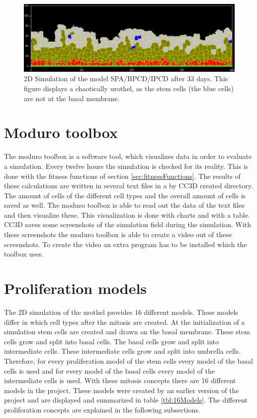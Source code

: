 \begin{figure}[ht]
	\center
	\includegraphics[scale=0.35]{figures/2DSimulation-33Days.png}
	\caption[2D Simulation of the model SPA/BPCD/IPCD after 33 days]{2D Simulation of the model SPA/BPCD/IPCD after 33 days. This figure displays a chaotically urothel, as the stem cells (the blue cells) are not at the basal membrane.}
	\label{img:2DSimulation33Days}
\end{figure}

\section{Moduro toolbox}
The moduro toolbox is a software tool, which visualizes data in order to evaluate a simulation. \newline
Every twelve hours the simulation is checked for its reality. This is done with the fitness functions of section \ref{sec:fitnessFunctions}. The results of these calculations are written in several text files in a by \ac{CC3D} created directory. The amount of cells of the different cell types and the overall amount of cells is saved as well. The moduro toolbox is able to read out the data of the text files and then visualize these. This visualization is done with charts and with a table. \newline
\ac{CC3D} saves some screenshots of the simulation field during the simulation. With these screenshots the moduro toolbox is able to create a video out of these screenshots. To create the video an extra program has to be installed which the toolbox  uses.

\section{Proliferation models}\label{sec:Models}
The 2D simulation of the urothel provides 16 different models. These models differ in which cell types after the mitosis are created. \newline 
At the initialization of a simulation stem cells are created and drawn on the basal membrane. These stem cells grow and split into basal cells. The basal cells grow and split into intermediate cells. These intermediate cells grow and split into umbrella cells. Therefore, for every proliferation model of the stem cells every model of the basal cells is used and for every model of the basal cells every model of the intermediate cells is used. \newline
With these mitosis concepts there are 16 different models in the project. These models were created by an earlier version of the project \cite{Torelli2017} and are displayed and summarized in table \ref{tbl:16Models}. The different proliferation concepts are explained in the following subsections.


